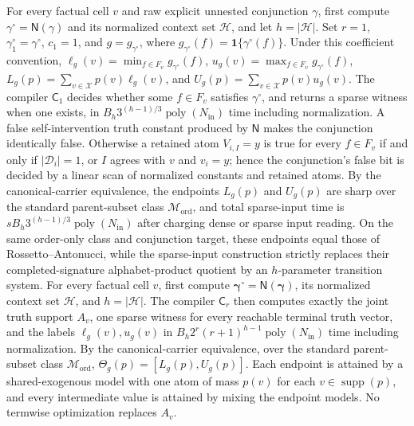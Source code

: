 For every factual cell \(v\) and raw explicit unnested conjunction \(\gamma\), first compute \(\gamma^{\circ}=\mathsf N(\gamma)\) and its normalized context set \(\mathcal H\), and let \(h=|\mathcal H|\). Set \(r=1\), \(\gamma_1^{\circ}=\gamma^{\circ}\), \(c_1=1\), and \(g=g_{\gamma^{\circ}}\), where \(g_{\gamma^{\circ}}(f)=\mathbf 1\{\gamma^{\circ}(f)\}\). Under this coefficient convention, \(\ell_g(v)=\min_{f\in F_v}g_{\gamma^{\circ}}(f)\), \(u_g(v)=\max_{f\in F_v}g_{\gamma^{\circ}}(f)\), \(L_g(p)=\sum_{v\in\mathcal X}p(v)\ell_g(v)\), and \(U_g(p)=\sum_{v\in\mathcal X}p(v)u_g(v)\). The compiler \(\mathsf C_1\) decides whether some \(f\in F_v\) satisfies \(\gamma^{\circ}\), and returns a sparse witness when one exists, in \(B_h3^{(h-1)/3}\operatorname{poly}(N_{\mathrm{in}})\) time including normalization. A false self-intervention truth constant produced by \(\mathsf N\) makes the conjunction identically false. Otherwise a retained atom \(V_{i,I}=y\) is true for every \(f\in F_v\) if and only if \(|\mathcal D_i|=1\), or \(I\) agrees with \(v\) and \(v_i=y\); hence the conjunction's false bit is decided by a linear scan of normalized constants and retained atoms. By the canonical-carrier equivalence, the endpoints \(L_g(p)\) and \(U_g(p)\) are sharp over the standard parent-subset class \(\mathcal M_{\mathrm{ord}}\), and total sparse-input time is \(sB_h3^{(h-1)/3}\operatorname{poly}(N_{\mathrm{in}})\) after charging dense or sparse input reading. On the same order-only class and conjunction target, these endpoints equal those of Rossetto--Antonucci, while the sparse-input construction strictly replaces their completed-signature alphabet-product quotient by an \(h\)-parameter transition system.
For every factual cell \(v\), first compute \(\boldsymbol\gamma^{\circ}=\mathsf N(\boldsymbol\gamma)\), its normalized context set \(\mathcal H\), and \(h=|\mathcal H|\). The compiler \(\mathsf C_r\) then computes exactly the joint truth support \(A_v\), one sparse witness for every reachable terminal truth vector, and the labels \(\ell_g(v),u_g(v)\) in \(B_h2^r(r+1)^{h-1}\operatorname{poly}(N_{\mathrm{in}})\) time including normalization. By the canonical-carrier equivalence, over the standard parent-subset class \(\mathcal M_{\mathrm{ord}}\), \(\Theta_g(p)=[L_g(p),U_g(p)]\). Each endpoint is attained by a shared-exogenous model with one atom of mass \(p(v)\) for each \(v\in\operatorname{supp}(p)\), and every intermediate value is attained by mixing the endpoint models. No termwise optimization replaces \(A_v\).
